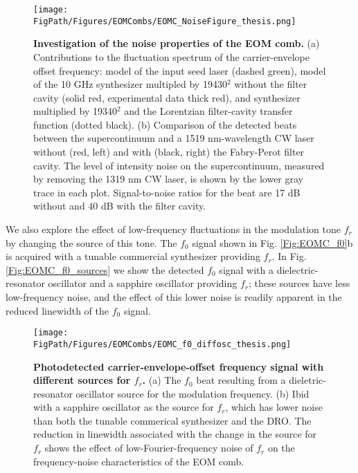 \begin{figure}[htpb]
	\begin{center}
		\texttt{[image: \\FigPath/Figures/EOMCombs/EOMC\_NoiseFigure\_thesis.png]}
	\end{center}
	\caption[Figure Title]{\textbf{Investigation of the noise properties of the EOM comb.}  (a) Contributions to the fluctuation spectrum of the carrier-envelope offset frequency: model of the input seed laser (dashed green), model of the 10 GHz synthesizer multipled by 19430$^2$ without the filter cavity (solid red, experimental data thick red), and synthesizer multiplied by 19340$^2$ and the Lorentzian filter-cavity transfer function (dotted black). (b) Comparison of the detected beats between the supercontinuum and a 1519 nm-wavelength CW laser without (red, left) and with (black, right) the Fabry-Perot filter cavity. The level of intensity noise on the supercontinuum, measured by removing the 1319 nm CW laser, is shown by the lower gray trace in each plot. Signal-to-noise ratios for the beat are 17 dB without and 40 dB with the filter cavity.}
	\label{fig:EOMC_noise}
\end{figure} 

We also explore the effect of low-frequency fluctuations in the modulation tone $f_r$ by changing the source of this tone. The $f_0$ signal shown in Fig. \ref{Fig:EOMC_f0}b is acquired with a tunable commercial synthesizer providing $f_r$. In Fig. \ref{Fig:EOMC_f0_sources} we show the detected $f_0$ signal with a dielectric-resonator oscillator and a sapphire oscillator providing $f_r$; these sources have less low-frequency noise, and the effect of this lower noise is readily apparent in the reduced linewidth of the $f_0$ signal.



\begin{figure}[htpb]
	\begin{center}
		\texttt{[image: \\FigPath/Figures/EOMCombs/EOMC\_f0\_diffosc\_thesis.png]}
	\end{center}
	\caption[Figure Title]{\textbf{Photodetected carrier-envelope-offset frequency signal with different sources for $f_r$.} (a) The $f_0$ beat resulting from a dieletric-resonator oscillator source for the modulation frequency. (b) Ibid with a sapphire oscillator as the source for $f_r$, which has lower noise than both the tunable commerical synthesizer and the DRO. The reduction in linewidth associated with the change in the source for $f_r$ shows the effect of low-Fourier-frequency noise of $f_r$ on the frequency-noise characteristics of the EOM comb. }
	\label{fig:EOMC_f0_sources}
\end{figure} 



